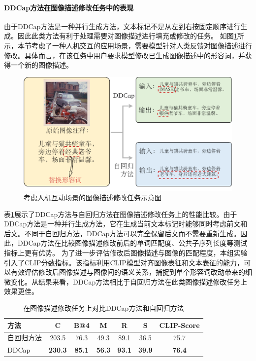 \paragraph{DDCap方法在图像描述修改任务中的表现}
由于DDCap方法是一种并行生成方法，文本标记不是从左到右按固定顺序进行生成。因此此类方法有利于处理需要对图像描述进行填充或修改的任务。
如图\ref{fig:ddcap-modification-task}所示，本节考虑了一种人机交互的应用场景，需要模型针对人类反馈对图像描述进行修改。具体而言，在该任务中用户要求模型修改已生成图像描述中的形容词，并获得一个新的图像描述。%
\begin{figure}
  \centering
  \includegraphics[width=0.8\linewidth]{figures/ddcap-modification-task.pdf}
  \caption{考虑人机互动场景的图像描述修改任务示意图}
  \label{fig:ddcap-modification-task}
\end{figure}

表\ref{tab:ddcap-infill}展示了DDCap方法与自回归方法在图像描述修改任务上的性能比较。由于DDCap方法是一种并行生成方法，它在生成当前文本标记时能够同时考虑前文和后文。不同于自回归方法，DDCap方法可以完全保留后文而不需要重新生成。因此，DDCap方法在比较图像描述修改前后的单词匹配度、公共子序列长度等测试指标上更有优势。
为了进一步评估修改后图像描述与图像的匹配程度，本组实验引入了CLIP分数\cite{CLIPScore}指标。该指标利用CLIP模型对齐图像表征和文本表征的能力，可以有效评估修改后图像描述与图像间的语义关系，捕捉到单个形容词改动带来的细微变化。从结果来看，DDCap方法相比于自回归方法在此类图像描述修改任务上效果更佳。

\begin{table}
  \centering
  \caption{在图像描述修改任务上对比DDCap方法和自回归方法}
  \begin{tabular}{lcccccc}
    \toprule
    方法 & C & B@4 & M & R & S & CLIP-Score\\
    \midrule
    自回归方法 & 203.5 & 76.3  & 49.3 &89.1& 36.5 & 75.7\\
    DDCap & \textbf{230.3} & \textbf{85.1}  &  \textbf{56.3} & \textbf{93.1} & \textbf{39.9} & \textbf{76.4}\\
    \bottomrule
  \end{tabular}
  \label{tab:ddcap-infill}
\end{table}

